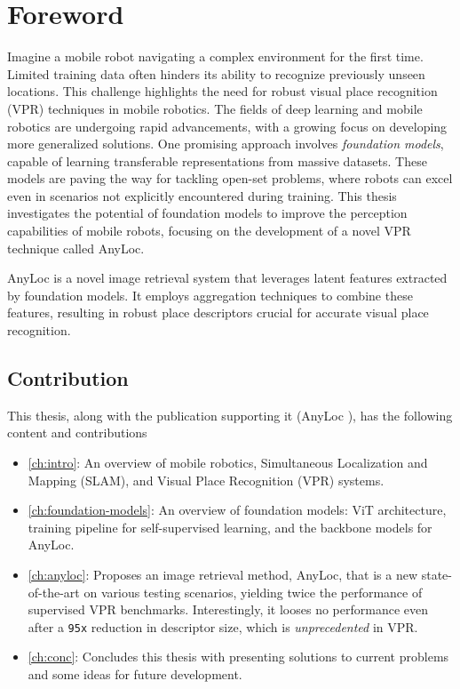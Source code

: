
\section{Foreword}

Imagine a mobile robot navigating a complex environment for the first
time.  Limited training data often hinders its ability to recognize
previously unseen locations. This challenge highlights the need for
robust visual place recognition (VPR) techniques in mobile robotics.
The fields of deep learning and mobile robotics are undergoing rapid
advancements, with a growing focus on developing more generalized
solutions. One promising approach involves \emph{foundation models},
capable of learning transferable representations from massive
datasets. These models are paving the way for tackling open-set
problems, where robots can excel even in scenarios not explicitly
encountered during training. This thesis investigates the potential of
foundation models to improve the perception capabilities of mobile
robots, focusing on the development of a novel VPR technique called
AnyLoc.

AnyLoc is a novel image retrieval system that leverages latent
features extracted by foundation models.  It employs aggregation
techniques to combine these features, resulting in robust place
descriptors crucial for accurate visual place recognition.

\subsection{Contribution}

This thesis, along with the publication supporting it (AnyLoc
\cite{Keetha2023AnyLocTU}), has the following content and 
contributions

\begin{itemize}
    \item \cref{ch:intro}: An overview of mobile robotics,
        Simultaneous Localization and Mapping (SLAM), and Visual Place
        Recognition (VPR) systems.
    \item \cref{ch:foundation-models}: An overview of foundation
        models: ViT architecture, training pipeline for
        self-supervised learning, and the backbone models for AnyLoc.
    \item \cref{ch:anyloc}: Proposes an image retrieval method,
        AnyLoc, that is a new state-of-the-art on various testing
        scenarios, yielding twice the performance of supervised VPR
        benchmarks. Interestingly, it looses no performance even after
        a \texttt{95x} reduction in descriptor size, which is
        \emph{unprecedented} in VPR.
    \item \cref{ch:conc}: Concludes this thesis with presenting
        solutions to current problems and some ideas for future
        development.
\end{itemize}

